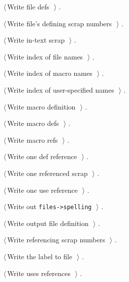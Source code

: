 \documentclass{report}
\begin{document}
{\begin{list}{}{\setlength{\itemsep}{-\parsep}\setlength{\itemindent}{-\leftmargin}}
\item $\langle\,$Write file defs\nobreak\ {\footnotesize {}}$\,\rangle$ {\footnotesize {\NWtxtRefIn} .}
\item $\langle\,$Write file's defining scrap numbers\nobreak\ {\footnotesize {}}$\,\rangle$ {\footnotesize {\NWtxtRefIn} .}
\item $\langle\,$Write in-text scrap\nobreak\ {\footnotesize {}}$\,\rangle$ {\footnotesize {\NWtxtRefIn} .}
\item $\langle\,$Write index of file names\nobreak\ {\footnotesize {}}$\,\rangle$ {\footnotesize {\NWtxtRefIn} .}
\item $\langle\,$Write index of macro names\nobreak\ {\footnotesize {}}$\,\rangle$ {\footnotesize {\NWtxtRefIn} .}
\item $\langle\,$Write index of user-specified names\nobreak\ {\footnotesize {}}$\,\rangle$ {\footnotesize {\NWtxtRefIn} .}
\item $\langle\,$Write macro definition\nobreak\ {\footnotesize {}}$\,\rangle$ {\footnotesize {\NWtxtRefIn} .}
\item $\langle\,$Write macro defs\nobreak\ {\footnotesize {}}$\,\rangle$ {\footnotesize {\NWtxtRefIn} .}
\item $\langle\,$Write macro refs\nobreak\ {\footnotesize {}}$\,\rangle$ {\footnotesize {\NWtxtRefIn} .}
\item $\langle\,$Write one def reference\nobreak\ {\footnotesize {}}$\,\rangle$ {\footnotesize {\NWtxtRefIn} .}
\item $\langle\,$Write one referenced scrap\nobreak\ {\footnotesize {}}$\,\rangle$ {\footnotesize {\NWtxtRefIn} .
}
\item $\langle\,$Write one use reference\nobreak\ {\footnotesize {}}$\,\rangle$ {\footnotesize {\NWtxtRefIn} .}
\item $\langle\,$Write out \verb|files->spelling|\nobreak\ {\footnotesize {}}$\,\rangle$ {\footnotesize {\NWtxtRefIn} .}
\item $\langle\,$Write output file definition\nobreak\ {\footnotesize {}}$\,\rangle$ {\footnotesize {\NWtxtRefIn} .}
\item $\langle\,$Write referencing scrap numbers\nobreak\ {\footnotesize {}}$\,\rangle$ {\footnotesize {\NWtxtRefIn} .}
\item $\langle\,$Write the label to file\nobreak\ {\footnotesize {}}$\,\rangle$ {\footnotesize {\NWtxtRefIn} .}
\item $\langle\,$Write uses references\nobreak\ {\footnotesize {}}$\,\rangle$ {\footnotesize {\NWtxtRefIn} .}
\end{list}}
\end{document}
